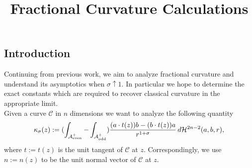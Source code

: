 \documentclass{article}
\title{Fractional Curvature Calculations}
\newcommand{\aeven}{\mathcal{A}_{\mathrm{even}}^+}
\newcommand{\aodd}{\mathcal{A}_{\mathrm{odd}}^+}
\begin{document}
\subsection{Introduction} Continuing from previous work, we aim to analyze fractional curvature and understand its asymptotics when $\sigma \uparrow 1$. In particular we hope to determine the exact constants which are required to recover classical curvature in the appropriate limit. \\

Given a curve $\mathcal{C}$ in $n$ dimensions we want to analyze the following quantity
$$
\kappa_\sigma(z) := \parens{\int_{\aeven} - \int_{\aodd}} \frac{\parens{a \cdot t(z)} b - \parens{b \cdot t(z)}a}{r^{1+\sigma}} \, d\mathcal{H}^{2n-2}\parens{a, b, r},
$$
where $t := t(z)$ is the unit tangent of $\mathcal{C}$ at $z$. Correspondingly, we use $n := n(z)$ to be the unit normal vector of $\mathcal{C}$ at $z$.
\end{document}
